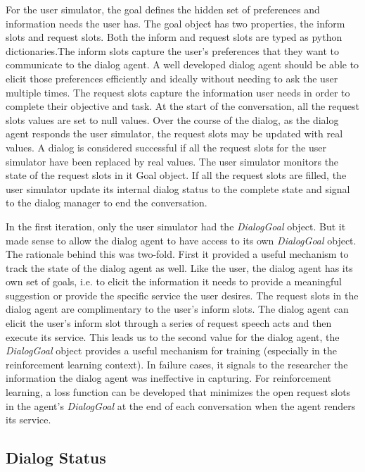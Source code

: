 For the user simulator, the goal defines the hidden set of preferences and information needs the user has. The goal object has two properties, the inform slots and request slots. Both the inform and request slots are typed as python dictionaries.The inform slots capture the user's preferences that they want to communicate to the dialog agent. A well developed dialog agent should be able to elicit those preferences efficiently and ideally without needing to ask the user multiple times. The request slots capture the information user needs in order to complete their objective and task. At the start of the conversation, all the request slots values are set to null values. Over the course of the dialog, as the dialog agent responds the user simulator, the request slots may be updated with real values. A dialog is considered successful if all the request slots for the user simulator have been replaced by real values. The user simulator monitors the state of the request slots in it Goal object. If all the request slots are filled, the user simulator update its internal dialog status to the complete state and signal to the dialog manager to end the conversation. 

In the first iteration, only the user simulator had the \textit{DialogGoal} object. But it made sense to allow the dialog agent to have access to its own \textit{DialogGoal} object. The rationale behind this was two-fold. First it provided a useful mechanism to track the state of the dialog agent as well. Like the user, the dialog agent has its own set of goals, i.e. to elicit the information it needs to provide a meaningful suggestion or provide the specific service the user desires. The request slots in the dialog agent are complimentary to the user's inform slots. The dialog agent can elicit the user's inform slot through a series of request speech acts and then execute its service. This leads us to the second value for the dialog agent, the \textit{DialogGoal} object provides a useful mechanism for training (especially in the reinforcement learning context). In failure cases, it signals to the researcher the information the dialog agent was ineffective in capturing. For reinforcement learning, a loss function can be developed that minimizes the open request slots in the agent's \textit{DialogGoal} at the end of each conversation when the agent renders its service. 


\subsection{Dialog Status}

